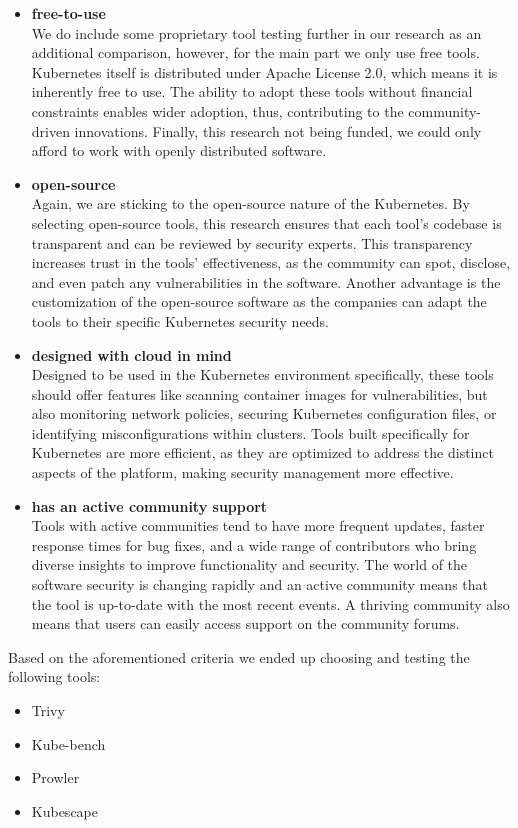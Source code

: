 \begin{itemize}
\item \textbf{free-to-use} \\
We do include some proprietary tool testing further in our research as an additional comparison, however, for the main part we only use free tools. Kubernetes itself is distributed under Apache License 2.0, which means it is inherently free to use. The ability to adopt these tools without financial constraints enables wider adoption, thus, contributing to the community-driven innovations. Finally, this research not being funded, we could only afford to work with openly distributed software.
\item \textbf{open-source} \\
Again, we are sticking to the open-source nature of the Kubernetes. By selecting open-source tools, this research ensures that each tool's codebase is transparent and can be reviewed by security experts. This transparency increases trust in the tools' effectiveness, as the community can spot, disclose, and even patch any vulnerabilities in the software. Another advantage is the customization of the open-source software as the companies can adapt the tools to their specific Kubernetes security needs.
\item \textbf{designed with cloud in mind} \\
Designed to be used in the Kubernetes environment specifically, these tools should offer features like scanning container images for vulnerabilities, but also monitoring network policies, securing Kubernetes configuration files, or identifying misconfigurations within clusters. Tools built specifically for Kubernetes are more efficient, as they are optimized to address the distinct aspects of the platform, making security management more effective.
\item \textbf{has an active community support} \\
Tools with active communities tend to have more frequent updates, faster response times for bug fixes, and a wide range of contributors who bring diverse insights to improve functionality and security. The world of the software security is changing rapidly and an active community means that the tool is up-to-date with the most recent events. A thriving community also means that users can easily access support on the community forums.
\end{itemize}

Based on the aforementioned criteria we ended up choosing and testing the following tools:
\begin{itemize}[noitemsep]
\item Trivy
\item Kube-bench
\item Prowler
\item Kubescape
\end{itemize}

